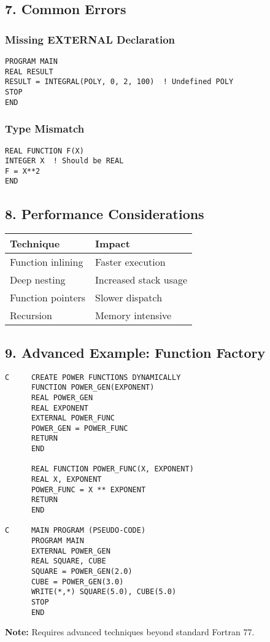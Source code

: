 \documentclass{book}
\begin{document}
\subsection*{7. Common Errors}
\subsubsection*{Missing EXTERNAL Declaration}
\begin{verbatim}
PROGRAM MAIN
REAL RESULT
RESULT = INTEGRAL(POLY, 0, 2, 100)  ! Undefined POLY
STOP
END
\end{verbatim}

\subsubsection*{Type Mismatch}
\begin{verbatim}
REAL FUNCTION F(X)
INTEGER X  ! Should be REAL
F = X**2
END
\end{verbatim}

\subsection*{8. Performance Considerations}
\begin{center}
\begin{tabular}{|l|l|}
\hline
\textbf{Technique} & \textbf{Impact} \\ 
\hline
Function inlining & Faster execution \\
Deep nesting & Increased stack usage \\
Function pointers & Slower dispatch \\
Recursion & Memory intensive \\
\hline
\end{tabular}
\end{center}

\subsection*{9. Advanced Example: Function Factory}
\begin{verbatim}
C     CREATE POWER FUNCTIONS DYNAMICALLY
      FUNCTION POWER_GEN(EXPONENT)
      REAL POWER_GEN
      REAL EXPONENT
      EXTERNAL POWER_FUNC
      POWER_GEN = POWER_FUNC
      RETURN
      END

      REAL FUNCTION POWER_FUNC(X, EXPONENT)
      REAL X, EXPONENT
      POWER_FUNC = X ** EXPONENT
      RETURN
      END

C     MAIN PROGRAM (PSEUDO-CODE)
      PROGRAM MAIN
      EXTERNAL POWER_GEN
      REAL SQUARE, CUBE
      SQUARE = POWER_GEN(2.0)
      CUBE = POWER_GEN(3.0)
      WRITE(*,*) SQUARE(5.0), CUBE(5.0)
      STOP
      END
\end{verbatim}
\textbf{Note:} Requires advanced techniques beyond standard Fortran 77.
\end{document}
